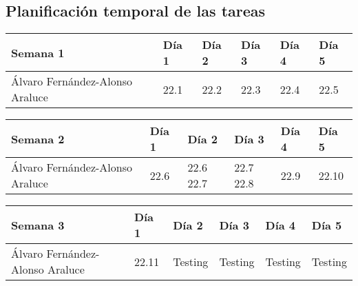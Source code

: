 \subsection{Planificación temporal de las tareas}

\begin{table}[h]
	\centering
	\begin{tabular}{| p{2cm} | p{2cm} | p{2cm} | p{2cm} | p{2cm} | p{2cm} |}
		\rowcolor[HTML]{329A9D} 
		 {\color[HTML]{FFFFFF} \textbf{Semana 1}} & {\color[HTML]{FFFFFF} \textbf{Día 1}} & {\color[HTML]{FFFFFF} \textbf{Día 2}} & {\color[HTML]{FFFFFF} \textbf{Día 3}} & {\color[HTML]{FFFFFF} \textbf{Día 4}}  & {\color[HTML]{FFFFFF} \textbf{Día 5}} \\ \hline
		Álvaro Fernández-Alonso Araluce & 22.1 & 22.2 & 22.3 & 22.4 & 22.5 \\ \hline
	\end{tabular}
\end{table}

\begin{table}[h]
	\centering
	\begin{tabular}{| p{2cm} | p{2cm} | p{2cm} | p{2cm} | p{2cm} | p{2cm} |}
		\rowcolor[HTML]{329A9D} 
		{\color[HTML]{FFFFFF} \textbf{Semana 2}} & {\color[HTML]{FFFFFF} \textbf{Día 1}} & {\color[HTML]{FFFFFF} \textbf{Día 2}} & {\color[HTML]{FFFFFF} \textbf{Día 3}} & {\color[HTML]{FFFFFF} \textbf{Día 4}}  & {\color[HTML]{FFFFFF} \textbf{Día 5}} \\ \hline
		Álvaro Fernández-Alonso Araluce & 22.6 & 22.6 22.7 & 22.7 22.8 & 22.9 & 22.10 \\ \hline
	\end{tabular}
\end{table}

\begin{table}[h]
	\centering
	\begin{tabular}{| p{2cm} | p{2cm} | p{2cm} | p{2cm} | p{2cm} | p{2cm} |}
		\rowcolor[HTML]{329A9D} 
		{\color[HTML]{FFFFFF} \textbf{Semana 3}} & {\color[HTML]{FFFFFF} \textbf{Día 1}} & {\color[HTML]{FFFFFF} \textbf{Día 2}} & {\color[HTML]{FFFFFF} \textbf{Día 3}} & {\color[HTML]{FFFFFF} \textbf{Día 4}}  & {\color[HTML]{FFFFFF} \textbf{Día 5}} \\ \hline
		Álvaro Fernández-Alonso Araluce & 22.11 & Testing & Testing & Testing & Testing \\ \hline
	\end{tabular}
\end{table}

